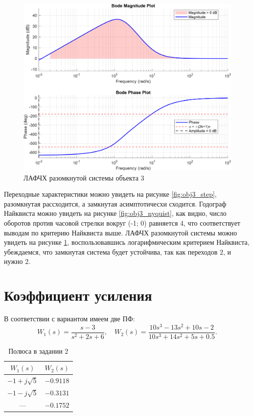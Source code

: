 \begin{figure}[H]
    \centering
    \includegraphics[width=\textwidth]{figs/task_1_obj_3_bode.png}
    \caption{ЛАФЧХ разомкнутой системы объекта 3}
    \label{fig:obj3_bode}
\end{figure}

Переходные характеристики можно увидеть на рисунке \ref{fig:obj3_step},
разомкнутая рассходится, а замкнутая асимптотичесхи сходится. 
Годограф Найквиста можно увидеть на рисунке 
\ref{fig:obj3_nyquist}, как видно, число оборотов против часовой стрелки
вокруг (-1; 0) равняется 4, что соответствует выводам по критерию Найквиста
выше. ЛАФЧХ разомкнутой системы можно увидеть на рисунке \ref{fig:obj3_bode},
воспользовавшись логарифмическим критерием Найквиста, убеждаемся, что 
замкнутая система будет устойчива, так как переходов $2$, и нужно $2$.


\newpage
\section{Коэффициент усиления}

В соответствии с вариантом имеем две ПФ:
\begin{equation*}
    W_1(s)=\frac{s-3}{s^2+2s+6},\quad W_2(s)=\frac{10s^3-13s^2+10s-2}{10s^3+14s^2+5s+0.5}.
\end{equation*}

\begin{table}[H]
    \centering
    \caption{Полюса в задании 2}
    \begin{tabular}{|c|c|}
        \hline
        $W_1(s)$ & $W_2(s)$ \\ \hline
        $-1 + j\sqrt 5$ & $-0.9118$ \\ \hline
        $-1 - j\sqrt 5$ & $-0.3131$ \\ \hline
         ---            & $-0.1752$ \\ \hline
    \end{tabular}
    \label{tab:2poles}
\end{table}

